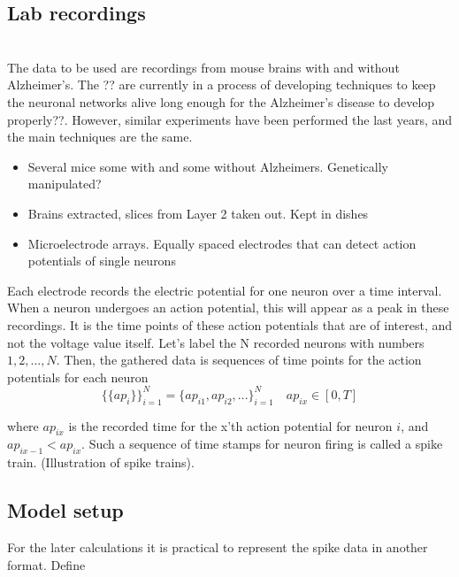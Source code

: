 \subsection{Lab recordings}

\label{Lab}\\
The data to be used are recordings from mouse brains with and without Alzheimer's. The ?? are currently in a process of developing techniques to keep the neuronal networks alive long enough for the Alzheimer's disease to develop properly??. However, similar experiments have been performed the last years, and the main techniques are the same. 
\begin{itemize}
    \item Several mice some with and some without Alzheimers. Genetically manipulated? 
    \item Brains extracted, slices from Layer 2 taken out. Kept in dishes
    \item Microelectrode arrays. Equally spaced electrodes that can detect action potentials of single neurons
    
\end{itemize}

Each electrode records the electric potential for one neuron over a time interval.  When a neuron undergoes an action potential, this will appear as a peak in these recordings. It is the time points of these action potentials that are of interest, and not the voltage value itself. Let's label the N recorded neurons with numbers $1,2,...,N$. Then, the gathered data is sequences of time points for the action potentials for each neuron
\begin{equation}
    \{\{ap_i\}\}_{i=1}^{N} = \{ap_{i1}, ap_{i2}, ...\}_{i=1}^{N} \quad ap_{ix} \in [0,T]
\end{equation}

where $ap_{ix}$ is the recorded time for the x'th action potential for neuron $i$, and $ap_{ix-1} < ap_{ix}$. Such a sequence of time stamps for neuron firing is called a spike train. (Illustration of spike trains).\\



\subsection{Model setup}
\label{set_up}

For the later calculations it is practical to represent the spike data in another format. Define

